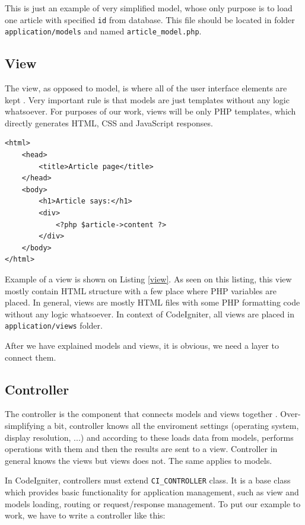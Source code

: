 This is just an example of very simplified model, whose only purpose is to load one article with specified \texttt{id} from database. This file should be located in folder \texttt{application/models} and named \texttt{article\_model.php}.


\subsection{View}
The view, as opposed to model, is where all of the user interface elements are kept \cite{phpmvc}. Very important rule is that models are just templates without any logic whatsoever. For purposes of our work, views will be only PHP templates, which directly generates HTML, CSS and JavaScript responses.

\begin{lstlisting}[label={view}, caption={Article view}]
<html>
	<head>
		<title>Article page</title>
	</head>
	<body>
		<h1>Article says:</h1>
		<div>
			<?php $article->content ?>
		</div>
	</body>
</html>
\end{lstlisting}


Example of a view is shown on Listing \ref{view}.  As seen on this listing, this view mostly contain HTML structure with a few place where PHP variables are placed. In general, views are mostly HTML files with some PHP formatting code without any logic whatsoever. In context of CodeIgniter, all views are placed in \texttt{application/views} folder.

After we have explained models and views, it is obvious, we need a layer to connect them.

\subsection{Controller}
The controller is the component that connects models and views together \cite{phpmvc}. Over-simplifying a bit, controller knows all the enviroment settings (operating system, display resolution, ...) and according to these loads data from models, performs operations with them and then the results are sent to a view. Controller in general knows the views but views does not. The same applies to models.

In CodeIgniter, controllers must extend \texttt{CI\_CONTROLLER} class. It is a base class which provides basic functionality for application management, such as view and models loading, routing or request/response management. To put our example to work, we have to write a controller like this:

